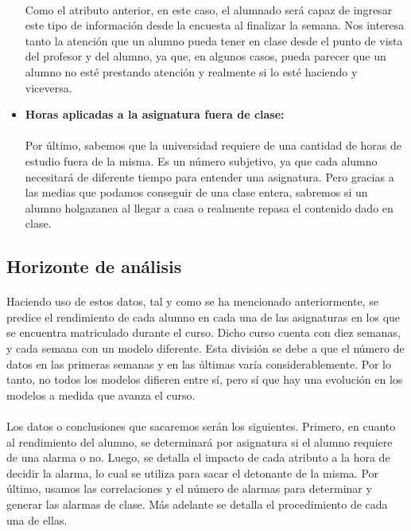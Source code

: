 \begin{itemize}
\paragraph{}
Como el atributo anterior, en este caso, el alumnado será capaz de ingresar este tipo de información desde la encuesta al finalizar la semana.  Nos interesa tanto la atención que un alumno pueda tener en clase desde el punto de vista del profesor y del alumno, ya que, en algunos casos, pueda parecer que un alumno no esté prestando atención y realmente si lo esté haciendo y viceversa.
\item \textbf{Horas aplicadas a la asignatura fuera de clase:}
\paragraph{}
Por último, sabemos que la universidad requiere de una cantidad de horas de estudio fuera de la misma. Es un número subjetivo, ya que cada alumno necesitará de diferente tiempo para entender una asignatura. Pero gracias a las medias que podamos conseguir de una clase entera, sabremos si un alumno holgazanea al llegar a casa o realmente repasa el contenido dado en clase.
\end{itemize}

\subsection{Horizonte de análisis}
\paragraph{}
Haciendo uso de estos datos, tal y como se ha mencionado anteriormente, se predice el rendimiento de cada alumno en cada una de las asignaturas en los que se encuentra matriculado durante el curso. Dicho curso cuenta con diez semanas, y cada semana con un modelo diferente. Esta división se debe a que el número de datos en las primeras semanas y en las últimas varía considerablemente. Por lo tanto, no todos los modelos difieren entre sí, pero sí que hay una evolución en los modelos a medida que avanza el curso.
\paragraph{}
Los datos o conclusiones que sacaremos serán los siguientes. Primero, en cuanto al rendimiento del alumno, se determinará por asignatura si el alumno requiere de una alarma o no. Luego, se detalla el impacto de cada atributo a la hora de decidir la alarma, lo cual se utiliza para sacar el detonante de la misma. Por último, usamos las correlaciones y el número de alarmas para determinar y generar las alarmas de clase. Más adelante se detalla el procedimiento de cada una de ellas.


